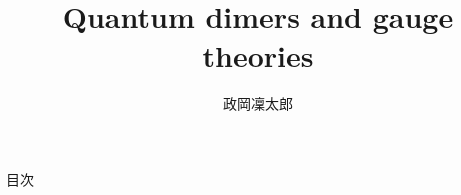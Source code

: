 \documentclass[8pt,unicode,xcolor=svgnames]{beamer}
\numberwithin{equation}{section}
\begin{document}
\title{Quantum dimers and gauge theories}
\author{政岡凜太郎}
\frame{\titlepage}
\begin{frame}{目次}\tableofcontents\end{frame}


    
    
    
\end{document}
